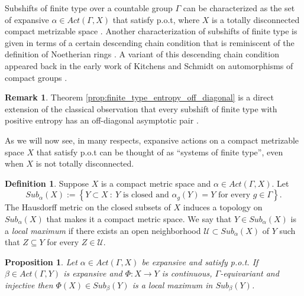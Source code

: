 \documentclass[oneside,english]{amsart}
\newtheorem{prop}[thm]{Proposition}
\theoremstyle{definition}
\newtheorem{defn}[thm]{Definition}
\newtheorem{remark}[thm]{Remark}
\newcommand{\Act}[2]{\mathit{Act}({#1},{#2})}
\newcommand{\subG}[2]{\mathit{Sub}_{{#1}}({#2})}
\begin{document}
Subshifts of finite type over a countable group $\Gamma$ can be characterized as the set of  expansive $\alpha \in \Act{\Gamma}{X}$   that satisfy p.o.t, where $X$ is a  totally disconnected compact metrizable space \cite{1611.08994,MR2353915,MR518563}.
Another characterization of  subshifts of finite type is given  in terms  of a certain descending chain condition that is reminiscent of the definition of Noetherian rings \cite{MR3493309}.
A variant of this descending chain condition appeared back in the early work of Kitchens and Schmidt on automorphisms of compact groups \cite{MR1036904}.
\begin{remark}
Theorem \ref{prop:finite_type_entropy_off_diagonal} is a direct extension of the classical observation that every subshift of finite type with positive entropy has an off-diagonal  asymptotic pair \cite[Proposition $2.1$]{MR1359979}.
\end{remark}
As we will now see,
in many respects, expansive actions on a compact metrizable space $X$ that satisfy p.o.t can be thought of as ``systems of finite type'', even when $X$ is not totally disconnected.

\begin{defn}
Suppose $X$ is a compact metric space and  $\alpha \in \Act{\Gamma}{X}$. Let
\begin{equation}\label{eq:subG}
\subG{\alpha}{X} := \left\{ Y \subset X ~:~ Y \mbox{ is closed and } \alpha_g(Y) =  Y \mbox{ for every } g \in \Gamma \right\}.
\end{equation}
The Hausdorff metric on the closed subsets of $X$ induces a topology on  $\subG{\alpha}{X}$ that makes it a compact metric space.
We say that $Y \in \subG{\alpha}{X}$ is a \emph{local maximum} if there exists an open neighborhood $\mathcal{U} \subset \subG{\alpha}{X}$  of $Y$ such that $Z \subseteq Y$ for every $Z \in \mathcal{U}$.
\end{defn}


\begin{prop}\label{prop:finite_type}
Let $\alpha \in \Act{\Gamma}{X}$ be expansive and satisfy p.o.t.
If $\beta \in \Act{\Gamma}{Y}$ is expansive and   $\Phi:X \to Y$ is continuous, $\Gamma$-equivariant and  injective then $\Phi(X)\in \subG{\beta}{Y}$ is a local maximum in $\subG{\beta}{Y}$.
\end{prop}
\end{document}
